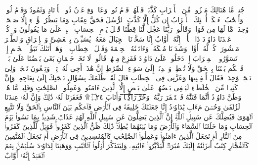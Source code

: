 \stopbuffer%
\startbuffer[\q:38:11]
جُندࣱ مَّا هُنَالِكَ مَهۡزُومࣱ مِّنَ ٱلۡأَحۡزَابِ%
\stopbuffer%
\startbuffer[\q:38:12]
كَذَّبَتۡ قَبۡلَهُمۡ قَوۡمُ نُوحࣲ وَعَادࣱ وَفِرۡعَوۡنُ ذُو ٱلۡأَوۡتَادِ%
\stopbuffer%
\startbuffer[\q:38:13]
وَثَمُودُ وَقَوۡمُ لُوطࣲ وَأَصۡحَٰبُ لۡءَیۡكَةِۚ أُو۟لَٰۤئِكَ ٱلۡأَحۡزَابُ%
\stopbuffer%
\startbuffer[\q:38:14]
إِن كُلٌّ إِلَّا كَذَّبَ ٱلرُّسُلَ فَحَقَّ عِقَابِ%
\stopbuffer%
\startbuffer[\q:38:15]
وَمَا یَنظُرُ هَٰۤؤُلَاۤءِ إِلَّا صَیۡحَةࣰ وَٰحِدَةࣰ مَّا لَهَا مِن فَوَاقࣲ%
\stopbuffer%
\startbuffer[\q:38:16]
وَقَالُوا۟ رَبَّنَا عَجِّل لَّنَا قِطَّنَا قَبۡلَ یَوۡمِ ٱلۡحِسَابِ%
\stopbuffer%
\startbuffer[\q:38:17]
ٱصۡبِرۡ عَلَىٰ مَا یَقُولُونَ وَٱذۡكُرۡ عَبۡدَنَا دَاوُۥدَ ذَا ٱلۡأَیۡدِۖ إِنَّهُۥۤ أَوَّابٌ%
\stopbuffer%
\startbuffer[\q:38:18]
إِنَّا سَخَّرۡنَا ٱلۡجِبَالَ مَعَهُۥ یُسَبِّحۡنَ بِٱلۡعَشِیِّ وَٱلۡإِشۡرَاقِ%
\stopbuffer%
\startbuffer[\q:38:19]
وَٱلطَّیۡرَ مَحۡشُورَةࣰۖ كُلࣱّ لَّهُۥۤ أَوَّابࣱ%
\stopbuffer%
\startbuffer[\q:38:20]
وَشَدَدۡنَا مُلۡكَهُۥ وَءَاتَیۡنَٰهُ ٱلۡحِكۡمَةَ وَفَصۡلَ ٱلۡخِطَابِ%
\stopbuffer%
\startbuffer[\q:38:21]
۞ وَهَلۡ أَتَىٰكَ نَبَؤُا۟ ٱلۡخَصۡمِ إِذۡ تَسَوَّرُوا۟ ٱلۡمِحۡرَابَ%
\stopbuffer%
\startbuffer[\q:38:22]
إِذۡ دَخَلُوا۟ عَلَىٰ دَاوُۥدَ فَفَزِعَ مِنۡهُمۡۖ قَالُوا۟ لَا تَخَفۡۖ خَصۡمَانِ بَغَىٰ بَعۡضُنَا عَلَىٰ بَعۡضࣲ فَٱحۡكُم بَیۡنَنَا بِٱلۡحَقِّ وَلَا تُشۡطِطۡ وَٱهۡدِنَاۤ إِلَىٰ سَوَاۤءِ ٱلصِّرَٰطِ%
\stopbuffer%
\startbuffer[\q:38:23]
إِنَّ هَٰذَاۤ أَخِی لَهُۥ تِسۡعࣱ وَتِسۡعُونَ نَعۡجَةࣰ وَلِیَ نَعۡجَةࣱ وَٰحِدَةࣱ فَقَالَ أَكۡفِلۡنِیهَا وَعَزَّنِی فِی ٱلۡخِطَابِ%
\stopbuffer%
\startbuffer[\q:38:24]
قَالَ لَقَدۡ ظَلَمَكَ بِسُؤَالِ نَعۡجَتِكَ إِلَىٰ نِعَاجِهِۦۖ وَإِنَّ كَثِیرࣰا مِّنَ ٱلۡخُلَطَاۤءِ لَیَبۡغِی بَعۡضُهُمۡ عَلَىٰ بَعۡضٍ إِلَّا ٱلَّذِینَ ءَامَنُوا۟ وَعَمِلُوا۟ ٱلصَّٰلِحَٰتِ وَقَلِیلࣱ مَّا هُمۡۗ وَظَنَّ دَاوُۥدُ أَنَّمَا فَتَنَّٰهُ فَٱسۡتَغۡفَرَ رَبَّهُۥ وَ̅خَ̅رَّ̅ ̅رَ̅ا̅كِ̅عࣰ̅ا̅ وَأَنَابَ ۝٢٤ ۩%
\stopbuffer%
\startbuffer[\q:38:25]
فَغَفَرۡنَا لَهُۥ ذَٰلِكَۖ وَإِنَّ لَهُۥ عِندَنَا لَزُلۡفَىٰ وَحُسۡنَ مَءَابࣲ%
\stopbuffer%
\startbuffer[\q:38:26]
یَٰدَاوُۥدُ إِنَّا جَعَلۡنَٰكَ خَلِیفَةࣰ فِی ٱلۡأَرۡضِ فَٱحۡكُم بَیۡنَ ٱلنَّاسِ بِٱلۡحَقِّ وَلَا تَتَّبِعِ ٱلۡهَوَىٰ فَیُضِلَّكَ عَن سَبِیلِ ٱللَّهِۚ إِنَّ ٱلَّذِینَ یَضِلُّونَ عَن سَبِیلِ ٱللَّهِ لَهُمۡ عَذَابࣱ شَدِیدُۢ بِمَا نَسُوا۟ یَوۡمَ ٱلۡحِسَابِ%
\stopbuffer%
\startbuffer[\q:38:27]
وَمَا خَلَقۡنَا ٱلسَّمَاۤءَ وَٱلۡأَرۡضَ وَمَا بَیۡنَهُمَا بَٰطِلࣰاۚ ذَٰلِكَ ظَنُّ ٱلَّذِینَ كَفَرُوا۟ۚ فَوَیۡلࣱ لِّلَّذِینَ كَفَرُوا۟ مِنَ ٱلنَّارِ%
\stopbuffer%
\startbuffer[\q:38:28]
أَمۡ نَجۡعَلُ ٱلَّذِینَ ءَامَنُوا۟ وَعَمِلُوا۟ ٱلصَّٰلِحَٰتِ كَٱلۡمُفۡسِدِینَ فِی ٱلۡأَرۡضِ أَمۡ نَجۡعَلُ ٱلۡمُتَّقِینَ كَٱلۡفُجَّارِ%
\stopbuffer%
\startbuffer[\q:38:29]
كِتَٰبٌ أَنزَلۡنَٰهُ إِلَیۡكَ مُبَٰرَكࣱ لِّیَدَّبَّرُوۤا۟ ءَایَٰتِهِۦ وَلِیَتَذَكَّرَ أُو۟لُوا۟ ٱلۡأَلۡبَٰبِ%
\stopbuffer%
\startbuffer[\q:38:30]
وَوَهَبۡنَا لِدَاوُۥدَ سُلَیۡمَٰنَۚ نِعۡمَ ٱلۡعَبۡدُ إِنَّهُۥۤ أَوَّابٌ%
\stopbuffer%
